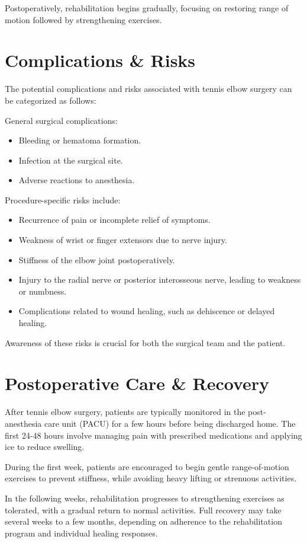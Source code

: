 Postoperatively, rehabilitation begins gradually, focusing on restoring range of motion followed by strengthening exercises.

\section*{Complications \& Risks}
The potential complications and risks associated with tennis elbow surgery can be categorized as follows:

General surgical complications:

\begin{itemize}
  \item Bleeding or hematoma formation.
  \item Infection at the surgical site.
  \item Adverse reactions to anesthesia.
\end{itemize}

Procedure-specific risks include:

\begin{itemize}
  \item Recurrence of pain or incomplete relief of symptoms.
  \item Weakness of wrist or finger extensors due to nerve injury.
  \item Stiffness of the elbow joint postoperatively.
  \item Injury to the radial nerve or posterior interosseous nerve, leading to weakness or numbness.
  \item Complications related to wound healing, such as dehiscence or delayed healing.
\end{itemize}

Awareness of these risks is crucial for both the surgical team and the patient.

\section*{Postoperative Care \& Recovery}
After tennis elbow surgery, patients are typically monitored in the post-anesthesia care unit (PACU) for a few hours before being discharged home. The first 24-48 hours involve managing pain with prescribed medications and applying ice to reduce swelling. 

During the first week, patients are encouraged to begin gentle range-of-motion exercises to prevent stiffness, while avoiding heavy lifting or strenuous activities. 

In the following weeks, rehabilitation progresses to strengthening exercises as tolerated, with a gradual return to normal activities. Full recovery may take several weeks to a few months, depending on adherence to the rehabilitation program and individual healing responses.

